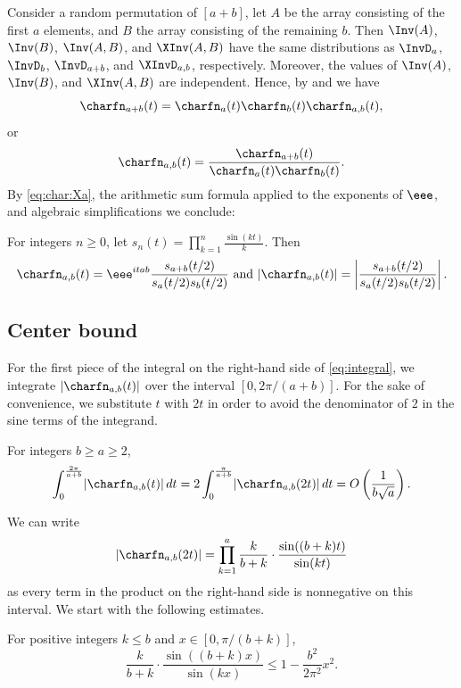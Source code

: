 \documentclass{toc}
\begin{document}
Consider a random permutation of $[a+b]$, let $A$ be the array consisting of the first $a$ elements, and $B$ the array consisting of the remaining $b$. Then $\Inv(A)$, $\Inv(B)$, $\Inv(A,B)$, and $\XInv(A,B)$ have the same distributions as $\InvD_a$, $\InvD_b$, $\InvD_{a+b}$, and $\XInvD_{a,b}$, respectively. Moreover, the values of $\Inv(A)$, $\Inv(B)$, and $\XInv(A,B)$ are independent. Hence, by  and  we have
\[\charfn_{a+b}(t)=\charfn_{a}(t)\charfn_{b}(t)\charfn_{a,b}(t), \]
or
\[\charfn_{a,b}(t)=\frac{\charfn_{a+b}(t)}{\charfn_a(t)\charfn_b(t)}. \]
By \eqref{eq:char:Xa}, the arithmetic sum formula applied to the exponents of $\eee$, and algebraic simplifications we conclude:
\begin{proposition}
\label{prop:characteristicfunction}
For integers $n\ge 0$, let $s_n(t)=\prod_{k=1}^n\frac{\sin(kt)}{k}$. Then 
    \[\charfn_{a,b}(t)=\eee^{itab}\frac{s_{a+b}(t/2)}{s_a(t/2)s_b(t/2)}
    \text{ and } \lvert\charfn_{a,b}(t)\rvert=\left| \frac{s_{a+b}(t/2)}{s_a(t/2)s_b(t/2)}\right|. 
    \]
\end{proposition}

\subsection{Center bound}
\label{sec:central}

For the first piece of the integral on the right-hand side of \eqref{eq:integral}, we integrate $\lvert\charfn_{a,b}(t)\rvert$ over the interval $[0,2\pi/(a+b)]$. For the sake of convenience, we substitute $t$ with $2t$ in order to avoid the denominator of $2$ in the sine terms of the integrand. 

\begin{lemma}
    \label{lemma:center}
    For integers $b\ge a\ge 2$,
    \[ \int_0^{\frac{2\pi}{a+b}} \lvert\charfn_{a,b}(t)\rvert\, dt = 2 \int_0^{\frac{\pi}{a+b}} \lvert\charfn_{a,b}(2t)\rvert\, dt = O\left(\frac{1}{b\sqrt{a}}\right). \]    
\end{lemma}

We can write 
\[\lvert\charfn_{a,b}(2t)\rvert=\prod_{k=1}^{a} \frac{k}{b+k}\cdot\frac{\sin((b+k)t)}{\sin(kt)} \]
as every term in the product on the right-hand side is nonnegative on this interval. We start with the following estimates.

\begin{claim}
    \label{claim:center3}
    For positive integers $k\le b$ and $x\in [0,\pi/(b+k)]$,
    \[\frac{k}{b+k}\cdot \frac{\sin((b+k)x)}{\sin(kx)}\le 1-\frac{b^2}{2\pi^2}x^2. \]
\end{claim}
\end{document}
